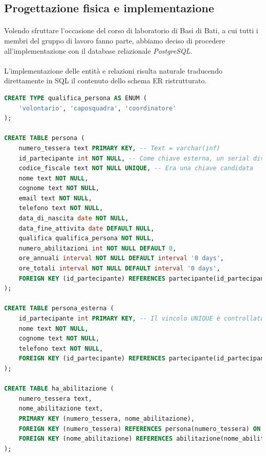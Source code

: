 \documentclass[11pt,a4paper,english]{article}
\begin{document}
\subsection{Progettazione fisica e implementazione}

\paragraph{} Volendo sfruttare l'occasione del corso di laboratorio di Basi di Bati, a cui tutti i membri del gruppo di lavoro fanno parte, abbiamo deciso di procedere all'implementazione con il database relazionale \emph{PostgreSQL}. 

\paragraph{} L'implementazione delle entità e relazioni risulta naturale traducendo direttamente in SQL il contenuto dello schema ER ristrutturato. 

\begin{lstlisting}[language=SQL, caption=Esempio di implementazione di entità e relazioni]
CREATE TYPE qualifica_persona AS ENUM (
    'volontario', 'caposquadra', 'coordinatore'
);

CREATE TABLE persona (
    numero_tessera text PRIMARY KEY, -- Text = varchar(inf)
    id_partecipante int NOT NULL, -- Come chiave esterna, un serial diventa int | Il vincolo UNIQUE è controllato dal trigger apposito
    codice_fiscale text NOT NULL UNIQUE, -- Era una chiave candidata
    nome text NOT NULL,
    cognome text NOT NULL,
    email text NOT NULL,
    telefono text NOT NULL,
    data_di_nascita date NOT NULL,
    data_fine_attivita date DEFAULT NULL,
    qualifica qualifica_persona NOT NULL,
    numero_abilitazioni int NOT NULL DEFAULT 0,
    ore_annuali interval NOT NULL DEFAULT interval '0 days',
    ore_totali interval NOT NULL DEFAULT interval '0 days',
    FOREIGN KEY (id_partecipante) REFERENCES partecipante(id_partecipante) ON DELETE NO ACTION ON UPDATE CASCADE
);

CREATE TABLE persona_esterna (
    id_partecipante int PRIMARY KEY, -- Il vincolo UNIQUE è controllato dal trigger apposito
    nome text NOT NULL,
    cognome text NOT NULL,
    telefono text NOT NULL,
    FOREIGN KEY (id_partecipante) REFERENCES partecipante(id_partecipante) ON DELETE NO ACTION ON UPDATE CASCADE
);

CREATE TABLE ha_abilitazione (
    numero_tessera text,
    nome_abilitazione text,
    PRIMARY KEY (numero_tessera, nome_abilitazione),
    FOREIGN KEY (numero_tessera) REFERENCES persona(numero_tessera) ON DELETE CASCADE ON UPDATE CASCADE,
    FOREIGN KEY (nome_abilitazione) REFERENCES abilitazione(nome_abilitazione) ON DELETE CASCADE ON UPDATE CASCADE
);
\end{lstlisting}
\end{document}

